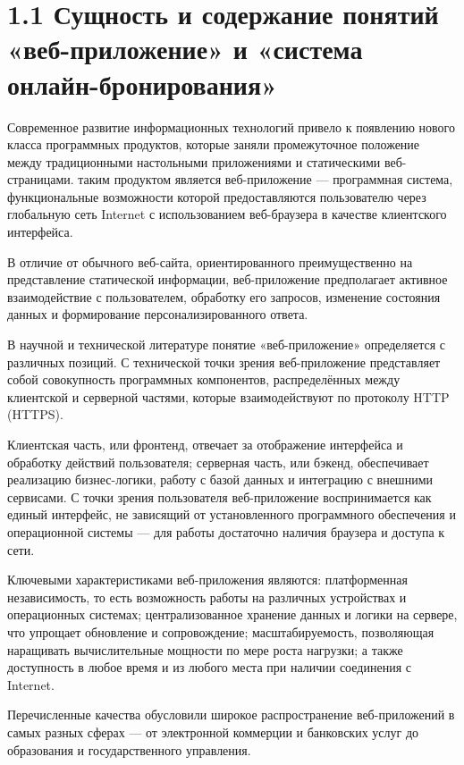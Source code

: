 \documentclass[14pt,a4paper,oneside]{extreport}
\begin{document}

\section*{1.1 Сущность и содержание понятий «веб-приложение» и «система онлайн-бронирования»}

Современное развитие информационных технологий привело к появлению нового класса программных продуктов, которые заняли промежуточное положение между традиционными настольными приложениями и статическими веб-страницами. таким продуктом является веб-приложение — программная система, функциональные возможности которой предоставляются пользователю через глобальную сеть Internet с использованием веб-браузера в качестве клиентского интерфейса.

В отличие от обычного веб-сайта, ориентированного преимущественно на представление статической информации, веб-приложение предполагает активное взаимодействие с пользователем, обработку его запросов, изменение состояния данных и формирование персонализированного ответа.

В научной и технической литературе понятие «веб-приложение» определяется с различных позиций. С технической точки зрения веб-приложение представляет собой совокупность программных компонентов, распределённых между клиентской и серверной частями, которые взаимодействуют по протоколу HTTP (HTTPS).

Клиентская часть, или фронтенд, отвечает за отображение интерфейса и обработку действий пользователя; серверная часть, или бэкенд, обеспечивает реализацию бизнес-логики, работу с базой данных и интеграцию с внешними сервисами. С точки зрения пользователя веб-приложение воспринимается как единый интерфейс, не зависящий от установленного программного обеспечения и операционной системы — для работы достаточно наличия браузера и доступа к сети.

Ключевыми характеристиками веб-приложения являются: платформенная независимость, то есть возможность работы на различных устройствах и операционных системах; централизованное хранение данных и логики на сервере, что упрощает обновление и сопровождение; масштабируемость, позволяющая наращивать вычислительные мощности по мере роста нагрузки; а также доступность в любое время и из любого места при наличии соединения с Internet.

Перечисленные качества обусловили широкое распространение веб-приложений в самых разных сферах — от электронной коммерции и банковских услуг до образования и государственного управления.
\end{document}
